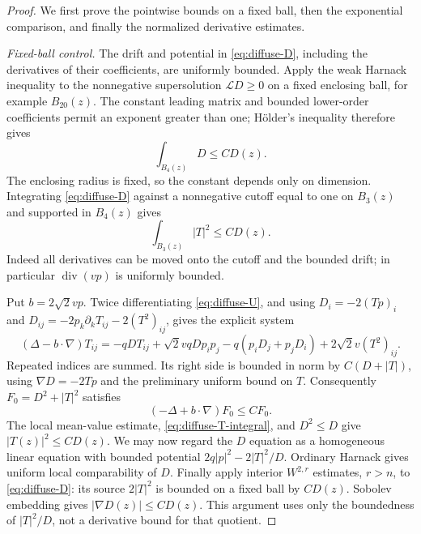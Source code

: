 \begin{proof}
We first prove the pointwise bounds on a fixed ball, then the exponential
comparison, and finally the normalized derivative estimates.

\emph{Fixed-ball control.}
The drift and potential in \eqref{eq:diffuse-D}, including the derivatives
of their coefficients, are uniformly bounded. Apply the weak Harnack
inequality to the nonnegative supersolution $\mathcal LD\ge0$ on a
fixed enclosing ball, for example $B_{20}(z)$. The constant leading
matrix and bounded lower-order coefficients permit an exponent
greater than one; H\"older's inequality therefore gives
\[
 \int_{B_4(z)}D\le C D(z).
\]
The enclosing radius is fixed, so the constant depends only on
dimension. Integrating \eqref{eq:diffuse-D} against a nonnegative
cutoff equal to one on $B_3(z)$ and supported in $B_4(z)$ gives
\begin{equation}\label{eq:diffuse-T-integral}
 \int_{B_3(z)}|T|^2\le C D(z).
\end{equation}
Indeed all derivatives can be moved onto the cutoff and the bounded drift;
in particular $\operatorname{div}(vp)$ is uniformly bounded.

Put $b=2\sqrt2 vp$. Twice differentiating
\eqref{eq:diffuse-U}, and using
$D_i=-2(Tp)_i$ and
$D_{ij}=-2p_k\partial_kT_{ij}-2(T^2)_{ij}$, gives the explicit system
\begin{equation}\label{eq:diffuse-T-system}
 (\Delta-b\cdot\nabla)T_{ij}
 =-qDT_{ij}+\sqrt2 vqD p_i p_j
       -q(p_iD_j+p_jD_i)+2\sqrt2 v(T^2)_{ij}.
\end{equation}
Repeated indices are summed. Its right side is bounded in norm by
$C(D+|T|)$, using $\nabla D=-2Tp$ and the preliminary uniform bound on
$T$. Consequently $F_0=D^2+|T|^2$ satisfies
\[
 (-\Delta+b\cdot\nabla)F_0\le C F_0.
\]
The local mean-value estimate, \eqref{eq:diffuse-T-integral}, and $D^2\le D$
give $|T(z)|^2\le C D(z)$. We may now regard the $D$ equation as a
homogeneous linear equation with bounded potential
$2q|p|^2-2|T|^2/D$. Ordinary Harnack gives uniform local comparability of
$D$. Finally apply interior $W^{2,r}$ estimates, $r>n$, to
\eqref{eq:diffuse-D}: its source $2|T|^2$ is bounded on a fixed ball by
$CD(z)$. Sobolev embedding gives $|\nabla D(z)|\le CD(z)$.
This argument uses only the boundedness of $|T|^2/D$, not a derivative
bound for that quotient.


\end{proof}

